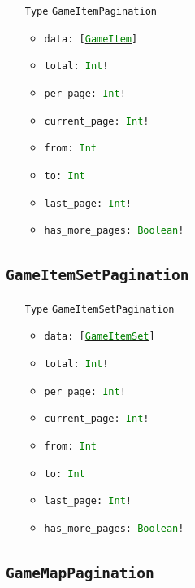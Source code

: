 \documentclass[10pt, a4paper]{memoir}
\numberwithin{equation}{section}
\theoremstyle{plain}
\theoremstyle{defp}
\theoremstyle{dotless}
\theoremstyle{definition}
\theoremstyle{dotless}
\theoremstyle{dotless}
\theoremstyle{defp}
\theoremstyle{defp}
\theoremstyle{be}          %
\theoremstyle{defp}
\newcommand\ttt[1]{\texttt{#1}}
\newcommand\type[1]{\ttt{\textcolor{green}{#1}}}
\begin{document}
\begin{itemize}[noitemsep,topsep=1pt]
\item[\ttt{Type}] \ttt{GameItemPagination}
\begin{itemize}[itemsep=1pt,topsep=1pt]
\item \ttt{data: [\hyperref[sec:GameItem]{\type{GameItem}}]}
\item \ttt{total: \type{Int}!}
\item \ttt{per\_page: \type{Int}!}
\item \ttt{current\_page: \type{Int}!}
\item \ttt{from: \type{Int}}
\item \ttt{to: \type{Int}}
\item \ttt{last\_page: \type{Int}!}
\item \ttt{has\_more\_pages: \type{Boolean}!}
\end{itemize}
\end{itemize}

\subsection{\ttt{GameItemSetPagination}}\label{sec:gameitemsetpagination}

\begin{itemize}[noitemsep,topsep=1pt]
\item[\ttt{Type}] \ttt{GameItemSetPagination}
\begin{itemize}[itemsep=1pt,topsep=1pt]
\item \ttt{data: [\hyperref[sec:GameItemSet]{\type{GameItemSet}}]}
\item \ttt{total: \type{Int}!}
\item \ttt{per\_page: \type{Int}!}
\item \ttt{current\_page: \type{Int}!}
\item \ttt{from: \type{Int}}
\item \ttt{to: \type{Int}}
\item \ttt{last\_page: \type{Int}!}
\item \ttt{has\_more\_pages: \type{Boolean}!}
\end{itemize}
\end{itemize}

\subsection{\ttt{GameMapPagination}}\label{sec:gamemappagination}
\end{document}
